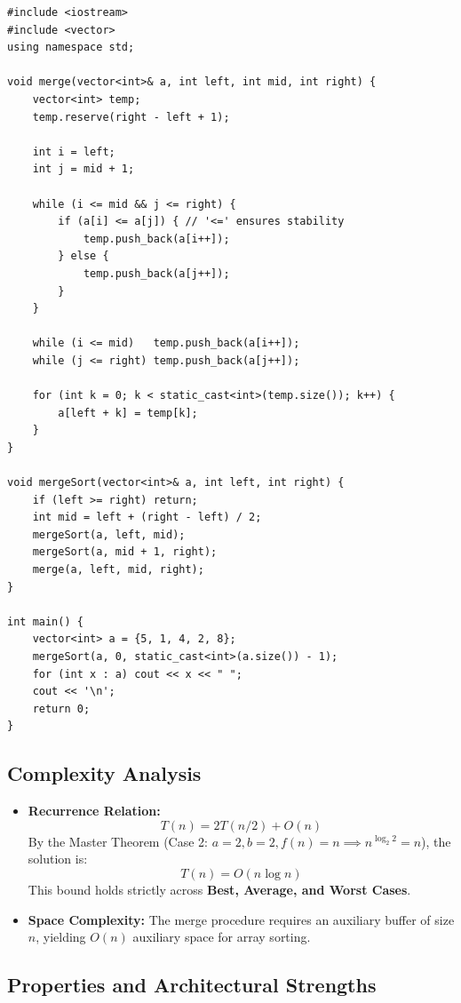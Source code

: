 \begin{lstlisting}[style=cppstyle, caption={C++ Merge Sort Implementation.}]
#include <iostream>
#include <vector>
using namespace std;

void merge(vector<int>& a, int left, int mid, int right) {
    vector<int> temp;
    temp.reserve(right - left + 1);

    int i = left;
    int j = mid + 1;

    while (i <= mid && j <= right) {
        if (a[i] <= a[j]) { // '<=' ensures stability
            temp.push_back(a[i++]);
        } else {
            temp.push_back(a[j++]);
        }
    }

    while (i <= mid)   temp.push_back(a[i++]);
    while (j <= right) temp.push_back(a[j++]);

    for (int k = 0; k < static_cast<int>(temp.size()); k++) {
        a[left + k] = temp[k];
    }
}

void mergeSort(vector<int>& a, int left, int right) {
    if (left >= right) return;
    int mid = left + (right - left) / 2;
    mergeSort(a, left, mid);
    mergeSort(a, mid + 1, right);
    merge(a, left, mid, right);
}

int main() {
    vector<int> a = {5, 1, 4, 2, 8};
    mergeSort(a, 0, static_cast<int>(a.size()) - 1);
    for (int x : a) cout << x << " ";
    cout << '\n';
    return 0;
}
\end{lstlisting}

\subsection{Complexity Analysis}
\begin{itemize}
    \item \textbf{Recurrence Relation:}
    \[
    \boxed{T(n) = 2T(n/2) + O(n)}
    \]
    By the Master Theorem (Case 2: $a=2, b=2, f(n)=n \implies n^{\log_2 2} = n$), the solution is:
    \[
    \boxed{T(n) = O(n \log n)}
    \]
    This bound holds strictly across \textbf{Best, Average, and Worst Cases}.
    \item \textbf{Space Complexity:} The merge procedure requires an auxiliary buffer of size $n$, yielding $\boxed{O(n)}$ auxiliary space for array sorting.
\end{itemize}

\subsection{Properties and Architectural Strengths}

